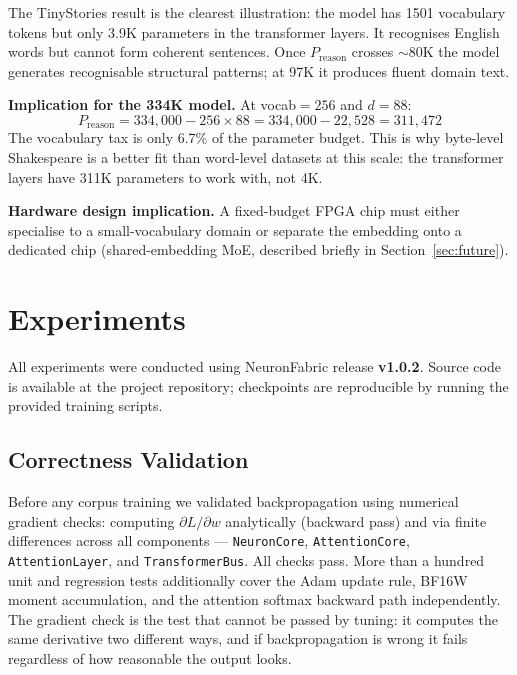 \documentclass[11pt]{article}
\begin{document}
The TinyStories result is the clearest illustration: the model has 1501 vocabulary
tokens but only 3.9K parameters in the transformer layers. It recognises English
words but cannot form coherent sentences. Once $P_{\text{reason}}$ crosses $\sim$80K
the model generates recognisable structural patterns; at 97K it produces fluent
domain text.

\textbf{Implication for the 334K model.} At vocab$=256$ and $d{=}88$:
\[
P_{\text{reason}} = 334{,}000 - 256 \times 88 = 334{,}000 - 22{,}528 = 311{,}472
\]
The vocabulary tax is only 6.7\% of the parameter budget. This is why byte-level
Shakespeare is a better fit than word-level datasets at this scale: the transformer
layers have 311K parameters to work with, not 4K.

\textbf{Hardware design implication.} A fixed-budget FPGA chip must either
specialise to a small-vocabulary domain or separate the embedding onto a dedicated
chip (shared-embedding MoE, described briefly in Section~\ref{sec:future}).

\section{Experiments}

\label{sec:experiments}

All experiments were conducted using NeuronFabric release \textbf{v1.0.2}.
Source code is available at the project repository; checkpoints are reproducible by running the provided training scripts.

\subsection{Correctness Validation}

Before any corpus training we validated backpropagation using numerical gradient
checks: computing $\partial L / \partial w$ analytically (backward pass) and via
finite differences across all components --- \texttt{NeuronCore},
\texttt{AttentionCore}, \texttt{AttentionLayer}, and \texttt{TransformerBus}.
All checks pass. More than a hundred unit and regression tests additionally cover the Adam update rule, BF16W moment
accumulation, and the attention softmax backward path independently.
The gradient check is the test that cannot be passed by tuning: it computes the
same derivative two different ways, and if backpropagation is wrong it fails
regardless of how reasonable the output looks.
\end{document}
